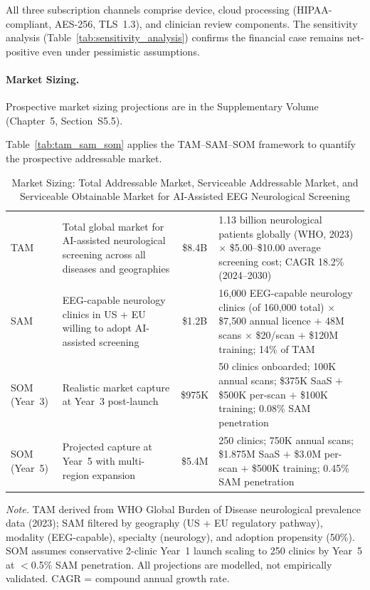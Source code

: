 \noindent All three subscription channels comprise device, cloud processing (HIPAA-compliant, AES-256, TLS~1.3), and clinician review components. The sensitivity analysis (Table~\ref{tab:sensitivity_analysis}) confirms the financial case remains net-positive even under pessimistic assumptions.

\paragraph{Market Sizing.} Prospective market sizing projections are in the Supplementary Volume (Chapter~5, Section~S5.5).

\iffalse
Table~\ref{tab:tam_sam_som} applies the TAM--SAM--SOM framework to quantify the prospective addressable market.

\begin{table}[H]
\tablestripes
\tablefontsize
\caption[Market Sizing: TAM, SAM, SOM]{Market Sizing: Total Addressable Market, Serviceable Addressable Market, and Serviceable Obtainable Market for AI-Assisted EEG Neurological Screening}
\begin{tabularx}{\textwidth}{@{} p{1.8cm} p{3cm} C L @{}}
\toprule
{} &  &  &  \\
\midrule
TAM & Total global market for AI-assisted neurological screening across all diseases and geographies & \$8.4B & 1.13 billion neurological patients globally (WHO, 2023) $\times$ \$5.00--\$10.00 average screening cost; CAGR 18.2\% (2024--2030) \\
\addlinespace
SAM & EEG-capable neurology clinics in US + EU willing to adopt AI-assisted screening & \$1.2B & 16{,}000 EEG-capable neurology clinics (of 160{,}000 total) $\times$ \$7{,}500 annual licence $+$ 48M scans $\times$ \$20/scan $+$ \$120M training; 14\% of TAM \\
\addlinespace
SOM (Year~3) & Realistic market capture at Year~3 post-launch & \$975K & 50 clinics onboarded; 100K annual scans; \$375K SaaS $+$ \$500K per-scan $+$ \$100K training; 0.08\% SAM penetration \\
\addlinespace
SOM (Year~5) & Projected capture at Year~5 with multi-region expansion & \$5.4M & 250 clinics; 750K annual scans; \$1.875M SaaS $+$ \$3.0M per-scan $+$ \$500K training; 0.45\% SAM penetration \\
\bottomrule
\end{tabularx}
\vspace{0.5em}\noindent\textit{Note.} TAM derived from WHO Global Burden of Disease neurological prevalence data (2023); SAM filtered by geography (US + EU regulatory pathway), modality (EEG-capable), specialty (neurology), and adoption propensity (50\%). SOM assumes conservative 2-clinic Year~1 launch scaling to 250 clinics by Year~5 at $<$0.5\% SAM penetration. All projections are modelled, not empirically validated. CAGR = compound annual growth rate.
\end{table}

